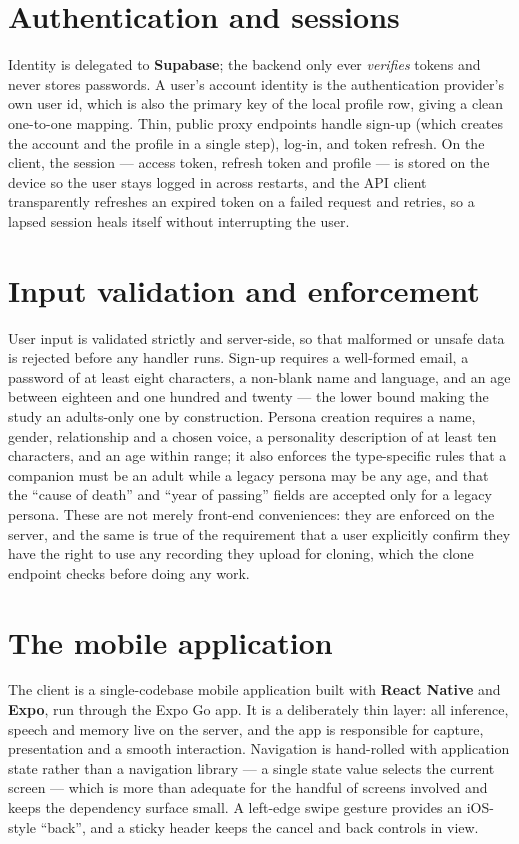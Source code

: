 \documentclass[11pt,a4paper]{report}
\begin{document}
\section{Authentication and sessions}
Identity is delegated to \textbf{Supabase}; the backend only ever \emph{verifies} tokens and never stores passwords. A user's account identity is the authentication provider's own user id, which is also the primary key of the local profile row, giving a clean one-to-one mapping. Thin, public proxy endpoints handle sign-up (which creates the account and the profile in a single step), log-in, and token refresh. On the client, the session --- access token, refresh token and profile --- is stored on the device so the user stays logged in across restarts, and the API client transparently refreshes an expired token on a failed request and retries, so a lapsed session heals itself without interrupting the user.

\section{Input validation and enforcement}
User input is validated strictly and server-side, so that malformed or unsafe data is rejected before any handler runs. Sign-up requires a well-formed email, a password of at least eight characters, a non-blank name and language, and an age between eighteen and one hundred and twenty --- the lower bound making the study an adults-only one by construction. Persona creation requires a name, gender, relationship and a chosen voice, a personality description of at least ten characters, and an age within range; it also enforces the type-specific rules that a companion must be an adult while a legacy persona may be any age, and that the ``cause of death'' and ``year of passing'' fields are accepted only for a legacy persona. These are not merely front-end conveniences: they are enforced on the server, and the same is true of the requirement that a user explicitly confirm they have the right to use any recording they upload for cloning, which the clone endpoint checks before doing any work.

\section{The mobile application}
The client is a single-codebase mobile application built with \textbf{React Native} and \textbf{Expo}, run through the Expo Go app. It is a deliberately thin layer: all inference, speech and memory live on the server, and the app is responsible for capture, presentation and a smooth interaction. Navigation is hand-rolled with application state rather than a navigation library --- a single state value selects the current screen --- which is more than adequate for the handful of screens involved and keeps the dependency surface small. A left-edge swipe gesture provides an iOS-style ``back'', and a sticky header keeps the cancel and back controls in view.
\end{document}
